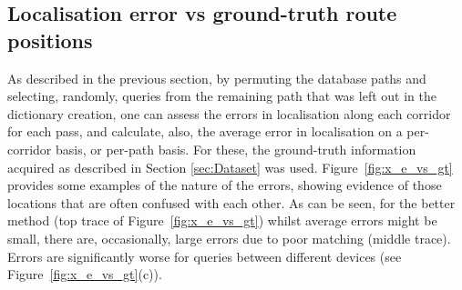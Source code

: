 \subsection{Localisation error vs ground-truth route positions}

As described in the previous section, by permuting the database paths and selecting, randomly, queries from the remaining path that was left out in the dictionary creation, one can assess the errors  in localisation along each corridor for each pass, and calculate, also, the average error in localisation on a per-corridor basis, or per-path basis.  For these, the ground-truth information acquired as described in Section \ref{sec:Dataset} was used.  Figure~\ref{fig:x_e_vs_gt} provides some examples of the nature of the errors, showing evidence of those locations that are often confused with each other.  As can be seen, for the better method (top trace of Figure~\ref{fig:x_e_vs_gt}) whilst average errors might be small, there are, occasionally, large errors due to poor matching (middle trace). Errors are significantly worse for queries between different devices (see Figure~\ref{fig:x_e_vs_gt}(c)). 

